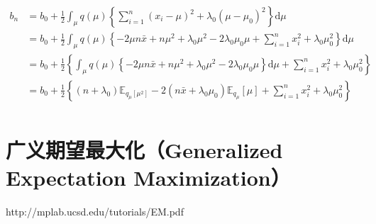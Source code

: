 \begin{displaymath}
\begin{split}
b_n &=  b_0 + \frac{1}{2} \int_{\mu} q(\mu)   \left \{ \sum_{i=1}^{n} (x_i - \mu)^2 + \lambda_0 (\mu-\mu_0)^2 \right \} \mathrm{d} \mu \\
&=  b_0 + \frac{1}{2} \int_{\mu} q(\mu)   \left \{ 
-2 \mu n \bar{x} + n \mu^2 + \lambda_0 \mu ^2 -2 \lambda_0 \mu_0 \mu + \sum_{i=1}^{n}x_i^2 + \lambda_0 \mu_0^2
\right \} \mathrm{d} \mu \\
&=  b_0 + \frac{1}{2} \left \{ \int_{\mu} q(\mu)   \left \{ 
-2 \mu n \bar{x} + n \mu^2 + \lambda_0 \mu ^2 -2 \lambda_0 \mu_0 \mu 
\right \} \mathrm{d} \mu + \sum_{i=1}^{n}x_i^2 + \lambda_0 \mu_0^2 \right \} \\
&=  b_0 + \frac{1}{2} \left \{
(n+\lambda_0) \mathbb{E}_{q_\mu[\mu^2]} - 2(n\bar{x}+\lambda_0\mu_0)\mathbb{E}_{q_\mu}[\mu]
+ \sum_{i=1}^{n}x_i^2 + \lambda_0 \mu_0^2 \right \} \\
\end{split}
\end{displaymath}

\section{广义期望最大化（Generalized Expectation Maximization）}

http://mplab.ucsd.edu/tutorials/EM.pdf



